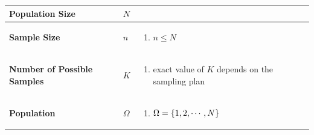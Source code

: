 \begin{customArrayStretch}{1.3}
\begin{longtable}{>{\RaggedRight\arraybackslash}p{4cm} >{\centering\arraybackslash}p{0.5cm} p{10.5cm}}

\hhline{=:=:=} \endfirsthead
\hhline{=:=:=} \endhead
\hhline{=:=:=} \endfoot
\hhline{=:=:=} \endlastfoot


\textbf{Population Size} &
    $N$ &
    \hfill \cite{statistics/book/Statistics-for-Data-Scientists/Maurits-Kaptein}
    \\ \hline

\textbf{Sample Size} &
    $n$ &
    \begin{minipage}{10.3cm}
        \vspace{0.15cm}
        \begin{enumerate}[itemsep=0.2cm]
            \item $n \leq N$
            \hfill \cite{statistics/book/Statistics-for-Data-Scientists/Maurits-Kaptein}
            
        \end{enumerate}
        \vspace{0.15cm}
    \end{minipage} 
    \\ \hline

\textbf{Number of Possible Samples} &
    $K$ &
    \begin{minipage}{10.3cm}
        \vspace{0.15cm}
        \begin{enumerate}[itemsep=0.2cm]
            \item exact value of $K$ depends on the sampling plan
            \hfill \cite{statistics/book/Statistics-for-Data-Scientists/Maurits-Kaptein}
            
        \end{enumerate}
        \vspace{0.15cm}
    \end{minipage} 
    \\ \hline

\textbf{Population} &
    $\Omega$ &
    \begin{minipage}{10.3cm}
        \vspace{0.15cm}
        \begin{enumerate}[itemsep=0.2cm]
            \item $\Omega = \left\{1,2,\cdots,N\right\}$
            \hfill \cite{statistics/book/Statistics-for-Data-Scientists/Maurits-Kaptein}
            

\end{enumerate}
\end{minipage}
\end{longtable}
\end{customArrayStretch}
